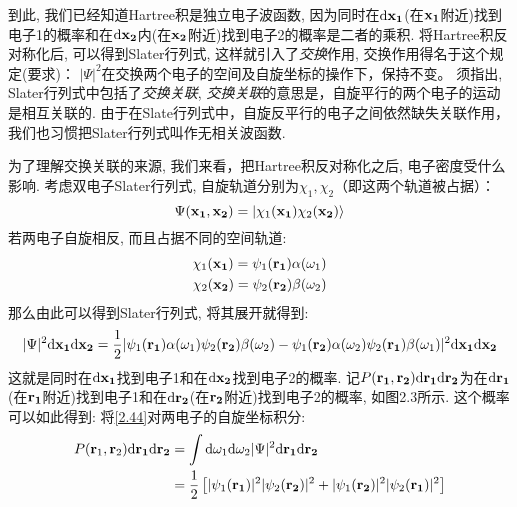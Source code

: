 
到此, 我们已经知道Hartree积是独立电子波函数, 因为同时在$\dd\bo{x_1}$(在$\mathbf{x_1}$附近)找到电子1的概率和在$\dd\bo{x_2}$内(在$\mathbf{x_2}$附近)找到电子2的概率是二者的乘积. 将Hartree积反对称化后, 可以得到Slater行列式, 这样就引入了\emph{交换}作用, 交换作用得名于这个规定(要求)： $|\Psi|^2$在交换两个电子的空间及自旋坐标的操作下，保持不变。 须指出, Slater行列式中包括了\emph{交换关联}, \emph{交换关联}的意思是，自旋平行的两个电子的运动是相互关联的. 由于在Slate行列式中，自旋反平行的电子之间依然缺失关联作用，我们也习惯把Slater行列式叫作无相关波函数.

为了理解交换关联的来源, 我们来看，把Hartree积反对称化之后, 电子密度受什么影响. 考虑双电子Slater行列式, 自旋轨道分别为$\chi_1,\chi_2$（即这两个轨道被占据）：
\begin{equation}
\Psi(\mathbf{x_1,x_2})=\Ket{\chi_1(\mathbf{x_1})\chi_2(\mathbf{x_2})}
\end{equation}
若两电子自旋相反, 而且占据不同的空间轨道:
\begin{align}
\chi_1(\mathbf{x_1})=\psi_1(\mathbf{r_1})\alpha(\omega_1)\\
\chi_2(\mathbf{x_2})=\psi_2(\mathbf{r_2})\beta(\omega_2)
\end{align}
那么由此可以得到Slater行列式, 将其展开就得到:
\begin{equation}
\label{2.44}
|\Psi|^2\dd\bo{x_1}\dd\bo{x_2}=\frac{1}{2}|\psi_1(\bo{r_1})\alpha(\omega_1)\psi_2(\bo{r_2})\beta(\omega_2)-\psi_1(\bo{r_2})\alpha(\omega_2)\psi_2(\bo{r_1})\beta(\omega_1)|^2\dd\bo{x_1}\dd\bo{x_2}
\end{equation}
这就是同时在$\dd\bo{x_1}$找到电子1和在$\dd\bo{x_2}$找到电子2的概率. 记$P(\bo{r_1,r_2})\dd\bo{r_1}\dd\bo{r_2}$为在$\dd\bo{r_1}$(在$\mathbf{r_1}$附近)找到电子1和在$\dd\bo{r_2}$(在$\mathbf{r_2}$附近)找到电子2的概率, 如图2.3所示. 这个概率可以如此得到: 将\ref{2.44}对两电子的自旋坐标积分:
\begin{align}
\label{2.45}
P(\mathbf{r}_1,\mathbf{r}_2)\dd\bo{r_1}\dd\bo{r_2}&=\int\dd\omega_1\dd\omega_2|\Psi|^2\db{r_1}\db{r_2}\notag\\
&=\frac{1}{2}\left[|\psi_1(\bo{r_1})|^2|\psi_2(\bo{r_2})|^2+|\psi_1(\bo{r_2})|^2|\psi_2(\bo{r_1})|^2\right]
\end{align}

